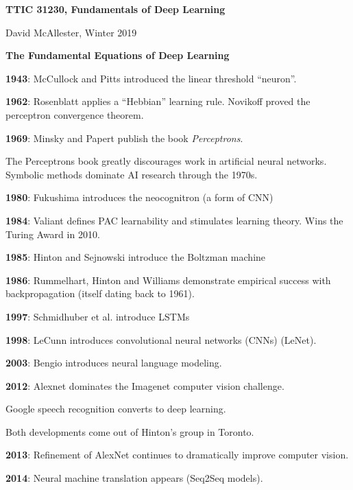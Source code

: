 




{\Huge
  \centerline{\bf TTIC 31230,  Fundamentals of Deep Learning}
  \vfill
  \centerline{David McAllester, Winter 2019}
  \vfill
  \centerline{\bf The Fundamental Equations of Deep Learning}



{\bf 1943}: McCullock and Pitts introduced the linear threshold ``neuron''.

\vfill
{\bf 1962}: Rosenblatt applies a ``Hebbian'' learning rule.  Novikoff proved the perceptron convergence theorem.

\vfill
{\bf 1969}: Minsky and Papert publish the book {\it Perceptrons}.

\vfill
The Perceptrons book greatly discourages work in artificial neural networks.  Symbolic methods dominate AI research through the 1970s.


{\bf 1980}: Fukushima introduces the neocognitron (a form of CNN)

\vfill
{\bf 1984}: Valiant defines PAC learnability and stimulates learning theory. Wins the Turing Award in 2010.

\vfill
{\bf 1985}: Hinton and Sejnowski introduce the Boltzman machine

\vfill
{\bf 1986}: Rummelhart, Hinton and Williams demonstrate empirical success with backpropagation (itself dating back to 1961).


{\bf 1997}: Schmidhuber et al. introduce LSTMs

\vfill
{\bf 1998}: LeCunn introduces convolutional neural networks (CNNs) (LeNet).

\vfill
{\bf 2003}: Bengio introduces neural language modeling.


{\bf 2012}: Alexnet dominates the Imagenet computer vision challenge.

\vfill
Google speech recognition converts to deep learning.

\vfill
Both developments come out of Hinton's group in Toronto.

\vfill
{\bf 2013}: Refinement of AlexNet continues to dramatically improve computer vision.


{\bf 2014}: Neural machine translation appears (Seq2Seq models).

}
